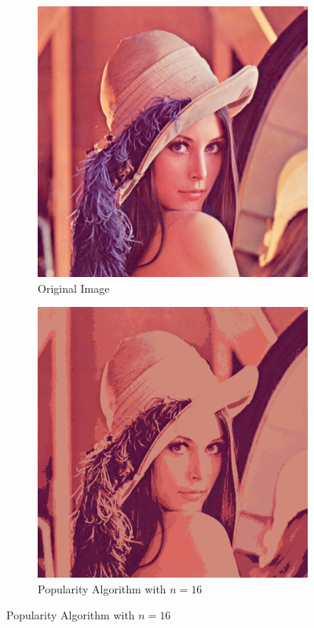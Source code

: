 \documentclass{article}
\begin{document}
\begin{figure}[!ht]
\begin{subfigure}{.5\textwidth}
\centering
\includegraphics[width=.75\linewidth]{lenna.png}
\caption{Original Image}
\end{subfigure}
\begin{subfigure}{.5\textwidth}
\centering
\includegraphics[width=.75\linewidth]{img1_1_16.png}
\caption{Popularity Algorithm with $n = 16$}
\end{subfigure}
\end{figure}
\end{document}
